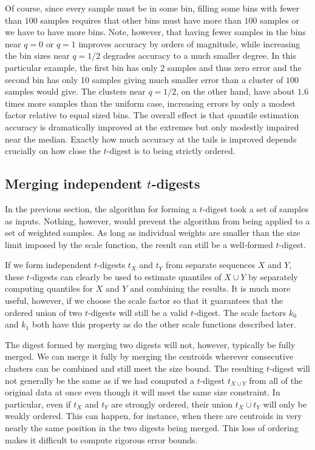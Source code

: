\documentclass[11pt]{amsart}
\begin{document}
Of course, since every sample must be in some bin, filling some bins with fewer than $100$ samples requires that other bins must have more than $100$ samples or we have to have more bins. Note, however, that having fewer samples in the bins near $q=0$ or $q=1$ improves accuracy by orders of magnitude, while increasing the bin sizes near $q=1/2$ degrades accuracy to a much smaller degree. In this particular example, the first bin has only 2 samples and thus zero error and the second bin has only 10 samples giving much smaller error than a cluster of $100$ samples would give. The clusters near $q=1/2$, on the other hand, have about $1.6$ times more samples than the uniform case, increasing errors by only a modest factor relative to equal sized bins. The overall effect is that quantile estimation accuracy is dramatically improved at the extremes but only modestly impaired near the median. Exactly how much accuracy at the tails is improved depends crucially on how close the $t$-digest is to being strictly ordered.

\subsection{Merging independent $t$-digests}
In the previous section, the algorithm for forming a $t$-digest took a set of samples as inputs. Nothing, however, would prevent the algorithm from being applied to a set of weighted samples. As long as individual weights are smaller than the size limit imposed by the scale function, the result can still be a well-formed $t$-digest.

If we form independent $t$-digests $t_X$ and $t_Y$ from separate sequences $X$ and $Y$, these $t$-digests can clearly be used to estimate quantiles of $X \cup Y$ by separately computing quantiles for $X$ and $Y$ and combining the results. It is much more useful, however, if we choose the scale factor so that it guarantees that the ordered union of two $t$-digests will still be a valid $t$-digest. The scale factors $k_0$ and $k_1$ both have this property as do the other scale functions described later.

The digest formed by merging two digests will not, however, typically be fully merged. We can merge it fully by merging the centroids wherever consecutive clusters can be combined and still meet the size bound. The resulting $t$-digest will not generally be the same as if we had computed a $t$-digest $t_{X \cup Y}$ from all of the original data at once even though it will meet the same size constraint. In particular, even if $t_X$ and $t_Y$ are strongly ordered, their union $t_X \cup t_Y$ will only be weakly ordered. This can happen, for instance, when there are centroids in very nearly the same position in the two digests being merged. This loss of ordering makes it difficult to compute rigorous error bounds.
\end{document}
